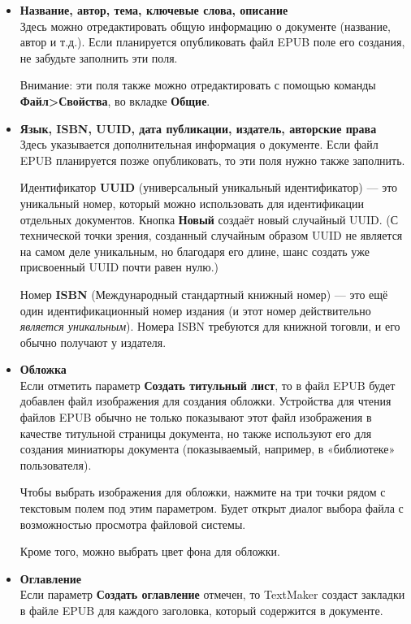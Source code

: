 ﻿\documentclass[a4paper,10pt]{article}
\begin{document}
\begin{itemize}
 \item \textbf{Название, автор, тема, ключевые слова, описание}\\
 Здесь можно отредактировать общую информацию о документе (название, автор и т.д.). Если планируется опубликовать файл EPUB поле его создания, не забудьте заполнить эти поля.
 
 Внимание: эти поля также можно отредактировать с помощью команды \textbf{Файл>Свойства}, во вкладке \textbf{Общие}.
 
 \item \textbf{Язык, ISBN, UUID, дата публикации, издатель, авторские права}\\
 Здесь указывается дополнительная информация о документе. Если файл EPUB планируется позже опубликовать, то эти поля нужно также заполнить.
 
 Идентификатор \textbf{UUID} (универсальный уникальный идентификатор) — это уникальный номер, который можно использовать для идентификации отдельных документов. Кнопка \textbf{Новый} создаёт новый случайный UUID. (С технической точки зрения, созданный случайным образом UUID не является на самом деле уникальным, но благодаря его длине, шанс создать уже присвоенный UUID почти равен нулю.)
 
Номер \textbf{ISBN} (Международный стандартный книжный номер) — это ещё один идентификационный номер издания (и этот номер действительно  \textit{является уникальным}). Номера ISBN требуются для книжной тоговли, и его обычно получают у издателя.

\item \textbf{Обложка}\\
Если отметить параметр \textbf{Создать титульный лист}, то в файл EPUB будет добавлен файл изображения для создания обложки. Устройства для чтения файлов EPUB обычно не только показывают этот файл изображения в качестве титульной страницы документа, но также используют его для создания миниатюры документа (показываемый, например, в «библиотеке» пользователя).

Чтобы выбрать изображения для обложки, нажмите на три точки рядом с текстовым полем под этим параметром. Будет открыт диалог выбора файла с возможностью просмотра файловой системы.

Кроме того, можно выбрать цвет фона для обложки.

\item \textbf{Оглавление}\\
Если параметр \textbf{Создать оглавление} отмечен, то TextMaker создаст закладки в файле EPUB для каждого заголовка, который содержится в документе.


\end{itemize}
\end{document}
